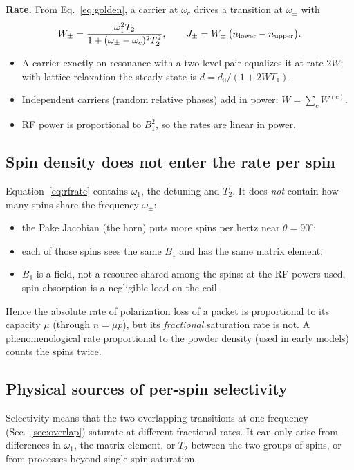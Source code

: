 \documentclass[11pt]{article}
\begin{document}
\textbf{Rate.} From Eq.~\eqref{eq:golden}, a carrier at $\omega_c$ drives a transition at
$\omega_\pm$ with
\begin{equation}
W_\pm=\frac{\omega_1^2T_2}{1+(\omega_\pm-\omega_c)^2T_2^2},\qquad
J_\pm=W_\pm\,\big(n_{\rm lower}-n_{\rm upper}\big).
\label{eq:rfrate}
\end{equation}
\begin{itemize}
\item A carrier exactly on resonance with a two-level pair equalizes it at rate $2W$; with
lattice relaxation the steady state is $d=d_0/(1+2WT_1)$.
\item Independent carriers (random relative phases) add in power: $W=\sum_c W^{(c)}$.
\item RF power is proportional to $B_1^2$, so the rates are linear in power.
\end{itemize}

\subsection{Spin density does not enter the rate per spin}
Equation~\eqref{eq:rfrate} contains $\omega_1$, the detuning and $T_2$. It does \emph{not}
contain how many spins share the frequency $\omega_\pm$:
\begin{itemize}
\item the Pake Jacobian (the horn) puts more spins per hertz near $\theta=90^\circ$;
\item each of those spins sees the same $B_1$ and has the same matrix element;
\item $B_1$ is a field, not a resource shared among the spins: at the RF powers used, spin
absorption is a negligible load on the coil.
\end{itemize}
Hence the absolute rate of polarization loss of a packet is proportional to its capacity $\mu$
(through $n=\mu p$), but its \emph{fractional} saturation rate is not. A phenomenological rate
proportional to the powder density (used in early models) counts the spins twice.

\subsection{Physical sources of per-spin selectivity}
\label{sec:selectivity}
Selectivity means that the two overlapping transitions at one frequency (Sec.~\ref{sec:overlap})
saturate at different fractional rates. It can only arise from differences in $\omega_1$, the
matrix element, or $T_2$ between the two groups of spins, or from processes beyond single-spin
saturation.
\end{document}
